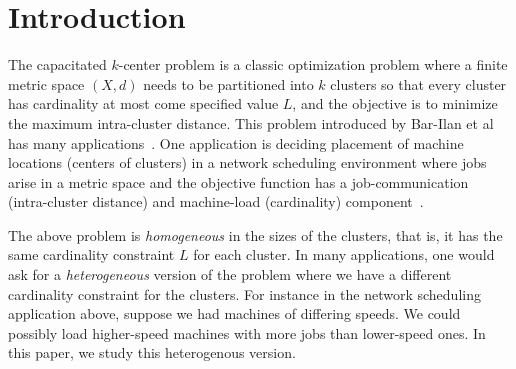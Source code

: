 \section{Introduction}
The capacitated $k$-center problem is a classic optimization problem where a finite metric space $(X,d)$ needs to be partitioned into $k$ clusters so that  every  cluster has cardinality at most
come specified value $L$, and the objective is to minimize the maximum intra-cluster distance. This problem introduced by Bar-Ilan et al~\cite{Bar-IlanKP93} has many applications~\cite{LuptonMY98, MorganL77, Murthy1983AnAA}. %
One application is deciding placement of machine locations (centers of clusters) in a network scheduling environment where jobs arise in a metric space and the objective function has a  job-communication (intra-cluster distance) and machine-load (cardinality)
component~\cite{PSW97}. %

The above problem is {\em homogeneous} in the sizes of the clusters, that is, it has the same cardinality constraint $L$ for each cluster. In many applications, one would ask for a \emph{heterogeneous} version of the problem where we have a different cardinality constraint for the clusters.
For instance in the network scheduling application above, suppose we had machines of differing speeds. We could possibly load higher-speed machines with more jobs than lower-speed ones. In this paper, we study  this heterogenous version.

